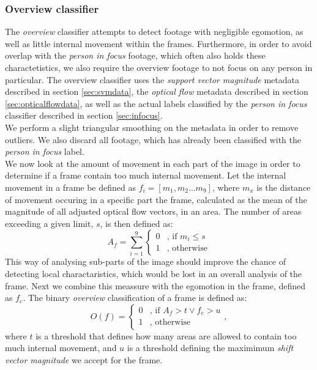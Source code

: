 \subsubsection{Overview classifier}\label{sec:overviewclassifier}
%
The \textit{overview} classifier attempts to detect footage with negligible egomotion, as well as little internal movement within the frames. Furthermore, in order to avoid overlap with the \textit{person in focus} footage, which often also holds these charactetistics, we also require the overview footage to not focus on any person in particular. The overview classifier uses the \textit{support vector magnitude} metadata described in section \ref{sec:svmdata}, the \textit{optical flow} metadata described in section \ref{sec:opticalflowdata}, as well as the actual labels classified by the \textit{person in focus} classifier described in section \ref{sec:infocus}.\\
We perform a slight triangular smoothing on the metadata in order to remove outliers. We also discard all footage, which has already been classified with the \textit{person in focus} label.\\
We now look at the amount of movement in each part of the image in order to determine if a frame contain too much internal movement. Let the internal movement in a frame be defined as $f_{i} = [m_{1},m_{2} \dots m_{9}]$, where $m_{x}$ is the distance of movement occuring in a specific part the frame, calculated as the mean of the magnitude of all adjusted optical flow vectors, in an area. The number of areas exceeding a given limit, $s$, is then defined as:
%
\begin{equation}
A_{f} = \sum_{i=1}^{9}
\begin{cases}
0 & \text{, if } m_{i} \leq s\\
1 &  \text{, otherwise}
\end{cases}
\end{equation}
%
This way of analysing sub-parts of the image should improve the chance of detecting local charactaristics, which would be lost in an overall analysis of the frame. %
 Next we combine this meassure with the egomotion in the frame, defined as $f_{e}$. The binary \textit{overview} classification of a frame is defined as:
\begin{equation}
O(f) =
\begin{cases}
0 & \text{, if } A_{f} > t \vee f_{e} > u \\
1 &  \text{, otherwise}
\end{cases},
\end{equation}
where $t$ is a threshold that defines how many areas are allowed to contain too much internal movement, and $u$ is a threshold defining the maximimum \textit{shift vector magnitude} we accept for the frame.
%
